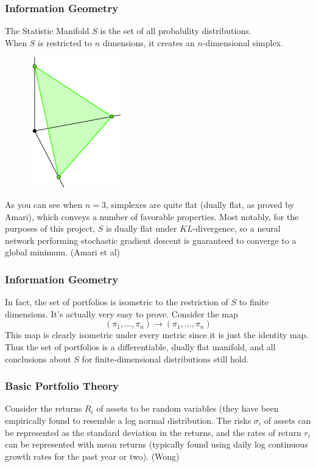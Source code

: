 \documentclass{beamer}
\begin{document}
\begin{frame}
\frametitle{Information Geometry}
The Statistic Manifold $S$ is the set of all probability distributions.
\\When $S$ is restricted to $n$ dimensions, it creates an $n$-dimensional simplex. 
\begin{figure}[t]
\includegraphics[scale=0.4]{simplex}
\centering
\end{figure}
As you can see when $n=3$, simplexes are quite flat (dually flat, as proved by Amari), which conveys a number of favorable properties.  Most notably, for the purposes of this project, $S$ is dually flat under $KL$-divergence, so a neural network performing stochastic gradient descent is guaranteed to converge to a global minimum. (Amari et al)
\end{frame}

\begin{frame}
\frametitle{Information Geometry}
In fact, the set of portfolios is isometric to the restriction of $S$ to finite dimensions.  It's actually very easy to prove.  Consider the map
\[(\pi_1, \dots, \pi_n) \rightarrow (\pi_1, \dots, \pi_n)\]
This map is clearly isometric under every metric since it is just the identity map.  Thus the set of portfolios is a differentiable, dually flat manifold, and all conclusions about $S$ for finite-dimensional distributions still hold.
\end{frame}

\begin{frame}
\frametitle{Basic Portfolio Theory}
Consider the returns $R_i$ of assets to be random variables (they have been empirically found to resemble a log normal distribution.  The risks $\sigma_i$ of assets can be represented as the standard deviation in the returns, and the rates of return $r_i$ can be represented with mean returns (typically found using daily log continuous growth rates for the past year or two).  (Wong)
\end{frame}
\end{document}
